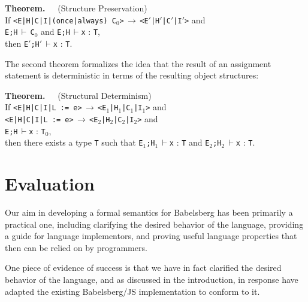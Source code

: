 \documentclass[10pt,reprint]{sigplanconf-preprint}
\newcommand{\stepH}[9]{{\tt <#1|#2|#3|#4|#5>}\,$\longrightarrow$\,{\tt <#6|#7|#8|#9>}}
\newcommand{\tcH}[4]{{\tt #1;#2}\,$\vdash${\tt #3} {\upshape :} {\tt #4}}
\newcommand{\tcHC}[3]{{\tt #1;#2}\,$\vdash$\,{\tt #3}}
\newcommand{\E}{\texttt{\upshape E}\xspace}
\newcommand{\C}{\texttt{C}}
\newcommand{\I}{\texttt{I}}
\renewcommand{\H}{\texttt{\upshape H}\xspace}
\newenvironment{theorem}{\noindent\textbf{Theorem.~~}}
{\hfill\\}
\begin{document}
\begin{sloppypar}
\begin{theorem} (Structure Preservation)\\
 If \stepH{\E}{\H}{\C}{\I}{(once|always)
   C$_0$}{\E$'$}{\H$'$}{\C$'$}{\I$'$} and \\\indent
 \tcHC{\E}{\H}{C$_0$} and \tcH{\E}{\H}{x}{T},\\then
  \tcH{\E$'$}{\H$'$}{x}{T}. 
\end{theorem}
\end{sloppypar}

The second theorem formalizes the idea that the result of an 
assignment statement is deterministic in terms of the resulting object
structures:
\newpage
\begin{sloppypar}
\begin{theorem} (Structural Determinism)\\
  If
  \stepH{\E}{\H}{\C}{\I}{L := e}{\E$_1$}{\H$_1$}{\C$_1$}{\I$_1$} and\\\indent
  \stepH{\E}{\H}{\C}{\I}{L := e}{\E$_2$}{\H$_2$}{\C$_2$}{\I$_2$} and\\\indent
  \tcH{\E}{\H}{x}{T$_0$},\\ 
then there exists a type {\tt T}
  such that
  \tcH{\E$_1$}{\H$_1$}{x}{T} and
  \tcH{\E$_2$}{\H$_2$}{x}{T}.
\end{theorem}
\end{sloppypar}

\section{Evaluation}
\label{sec:evaluation}

Our aim in developing a formal semantics for Babelsberg has been
primarily a practical one, including clarifying the desired behavior
of the language, providing a guide for language implementors, and
proving useful language properties that then can be relied on by
programmers.

One piece of evidence of success is that we have in fact clarified the
desired behavior of the language, and as discussed in the
introduction, in response have adapted the existing Babelsberg/JS
implementation to conform to it.
\end{document}
